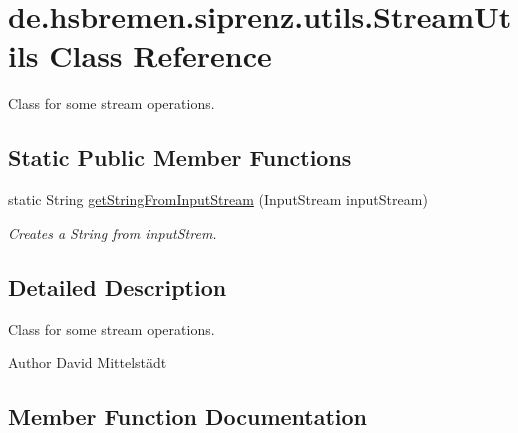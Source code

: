 \hypertarget{classde_1_1hsbremen_1_1siprenz_1_1utils_1_1StreamUtils}{}\section{de.\+hsbremen.\+siprenz.\+utils.\+Stream\+Utils Class Reference}
\label{classde_1_1hsbremen_1_1siprenz_1_1utils_1_1StreamUtils}


Class for some stream operations.  


\subsection*{Static Public Member Functions}
\begin{DoxyCompactItemize}
\item 
static String \hyperlink{classde_1_1hsbremen_1_1siprenz_1_1utils_1_1StreamUtils_ab71abe87e68127839ad2800ba0912c82}{get\+String\+From\+Input\+Stream} (Input\+Stream input\+Stream)
\begin{DoxyCompactList}\small\item\em Creates a String from input\+Strem. \end{DoxyCompactList}\end{DoxyCompactItemize}


\subsection{Detailed Description}
Class for some stream operations. 

\begin{DoxyAuthor}{Author}
David Mittelstädt 
\end{DoxyAuthor}


\subsection{Member Function Documentation}
